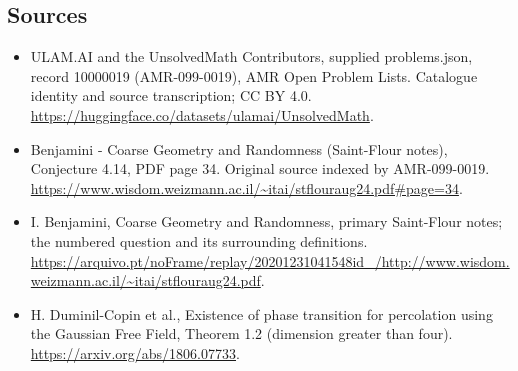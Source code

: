 \documentclass[11pt,a4paper]{article}
\begin{document}
\subsection{Sources}
\begin{itemize}
\item[S1] ULAM.AI and the UnsolvedMath Contributors, supplied problems.json, record 10000019 (AMR-099-0019), AMR Open Problem Lists. Catalogue identity and source transcription; CC BY 4.0.
\url{https://huggingface.co/datasets/ulamai/UnsolvedMath}.
\item[S2] Benjamini - Coarse Geometry and Randomness (Saint-Flour notes), Conjecture 4.14, PDF page 34. Original source indexed by AMR-099-0019.
\url{https://www.wisdom.weizmann.ac.il/~itai/stflouraug24.pdf#page=34}.
\item[S3] I. Benjamini, Coarse Geometry and Randomness, primary Saint-Flour notes; the numbered question and its surrounding definitions.
\url{https://arquivo.pt/noFrame/replay/20201231041548id_/http://www.wisdom.weizmann.ac.il/~itai/stflouraug24.pdf}.
\item[S4] H. Duminil-Copin et al., Existence of phase transition for percolation using the Gaussian Free Field, Theorem 1.2 (dimension greater than four).
\url{https://arxiv.org/abs/1806.07733}.
\end{itemize}
\end{document}
